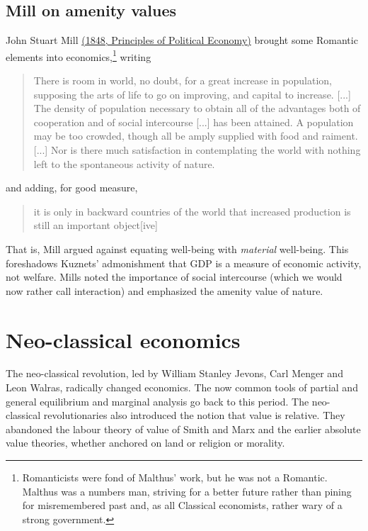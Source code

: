 \subsection{Mill on amenity values}
John Stuart Mill \href{https://www.gutenberg.org/files/30107/30107-pdf.pdf}{(1848, Principles of Political Economy)} brought some Romantic elements into economics,\footnote{Romanticists were fond of Malthus' work, but he was not a Romantic. Malthus was a numbers man, striving for a better future rather than pining for misremembered past and, as all Classical economists, rather wary of a strong government.} writing
\begin{quote}
    There is room in world, no doubt, for a great increase in population, supposing the arts of life to go on improving, and capital to increase. [...] The density of population necessary to obtain all of the advantages both of cooperation and of social intercourse [...] has been attained. A population may be too crowded, though all be amply supplied with food and raiment. [...] Nor is there much satisfaction in contemplating the world with nothing left to the spontaneous activity of nature.
\end{quote}
and adding, for good measure,
\begin{quote}
    it is only in backward countries of the world that increased production is still an important object[ive]
\end{quote}
That is, Mill argued against equating well-being with \emph{material} well-being. This foreshadows Kuznets' admonishment that GDP is a measure of economic activity, not welfare. Mills noted the importance of social intercourse (which we would now rather call interaction) and emphasized the amenity value of nature.

\section{Neo-classical economics}
The neo-classical revolution, led by William Stanley Jevons, Carl Menger and Leon Walras, radically changed economics. The now common tools of partial and general equilibrium and marginal analysis go back to this period. The neo-classical revolutionaries also introduced the notion that value is relative. They abandoned the labour theory of value of Smith and Marx and the earlier absolute value theories, whether anchored on land or religion or morality.

